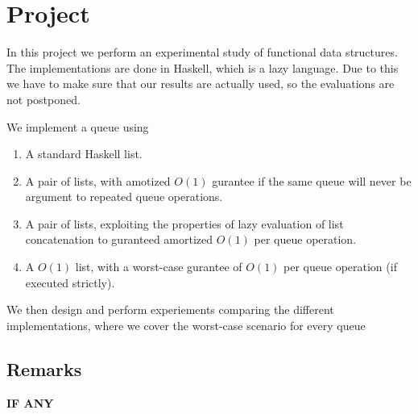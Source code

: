 \section*{Project}
In this project we perform an experimental study of functional data structures. The implementations are done in Haskell, which is a lazy language. Due to this we have to make sure that our results are actually used, so the evaluations are not postponed.

We implement a queue using
\begin{enumerate}
 \item A standard Haskell list.
 \item A pair of lists, with amotized $O(1)$ gurantee if the same queue will never be argument to repeated queue operations.
 \item A pair of lists, exploiting the properties of lazy evaluation of list concatenation to guranteed amortized $O(1)$ per queue operation.
 \item A $O(1)$ list, with a worst-case gurantee of $O(1)$ per queue operation (if executed strictly).
\end{enumerate}

We then design and perform experiements comparing the different implementations, where we cover the worst-case scenario for every queue

\subsection*{Remarks}
\textbf{IF ANY}